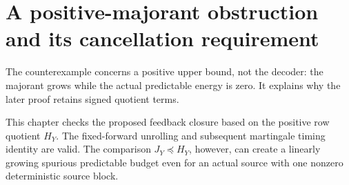 \documentclass[11pt,oneside,openany,a4paper]{book}
\numberwithin{equation}{chapter}
\theoremstyle{definition}
\theoremstyle{remark}
\newcommand{\proofstep}[1]{\par\addvspace{.45\baselineskip}\Needspace{3\baselineskip}\textbf{#1}\par\nobreak}
\newcommand{\R}{\mathbb R}\newcommand{\E}{\mathbb E}\newcommand{\Prb}{\mathbb P}\newcommand{\PP}{\mathbb P}
\newcommand{\T}{\mathsf T}\newcommand{\Id}{I}
\newcommand{\F}[1]{\left\lVert#1\right\rVert_F}
\newcommand{\N}[1]{\left\lVert#1\right\rVert}
\newcommand{\op}[1]{\left\lVert#1\right\rVert_{\rm op}}
\newcommand{\ip}[2]{\left\langle#1,#2\right\rangle_F}
\DeclareMathOperator{\tr}{tr}\DeclareMathOperator{\rank}{rank}
\DeclareMathOperator{\diag}{blockdiag}\DeclareMathOperator{\range}{range}
\DeclareMathOperator{\HSS}{HSS}\DeclareMathOperator{\dist}{dist}
\DeclareMathOperator{\Var}{Var}\DeclareMathOperator{\supp}{supp}
\newcommand{\UC}{\mathcal U}\newcommand{\VC}{\mathcal V}\newcommand{\err}{\mathcal E}
\newcommand{\Sn}[2]{\left\lVert#1\right\rVert_{S_{#2}}}
\newcommand{\Cov}{\mathsf C}\newcommand{\Loss}{\mathsf L}\newcommand{\Fil}{\mathcal F}
\DeclareMathOperator{\diver}{div}\DeclareMathOperator{\vecop}{vec}\DeclareMathOperator{\Gammafun}{Gamma}
\begin{document}
\begingroup
\let\R\relax
\newcommand{\R}{\mathbb R}
\let\E\relax
\newcommand{\E}{\mathbb E}
\let\Prb\relax
\newcommand{\Prb}{\mathbb P}
\let\T\relax
\newcommand{\T}{\mathsf T}
\let\F\relax
\newcommand{\F}[1]{\left\lVert#1\right\rVert_{F}}
\let\N\relax
\newcommand{\N}[1]{\left\lVert#1\right\rVert}
\let\ip\relax
\newcommand{\ip}[2]{\left\langle#1,#2\right\rangle_F}
\let\tr\relax
\newcommand{\tr}{\operatorname{tr}}
\let\rank\relax
\newcommand{\rank}{\operatorname{rank}}
\let\diag\relax
\newcommand{\diag}{\operatorname{blockdiag}}
\let\range\relax
\newcommand{\range}{\operatorname{range}}
\let\OPT\relax
\newcommand{\OPT}{\operatorname{OPT}}
\let\HSS\relax
\newcommand{\HSS}{\operatorname{HSS}}
\let\diver\relax
\newcommand{\diver}{\operatorname{div}}
\let\Var\relax
\newcommand{\Var}{\operatorname{Var}}
\let\UC\relax
\newcommand{\UC}{\mathcal U}
\let\VC\relax
\newcommand{\VC}{\mathcal V}
\let\err\relax
\newcommand{\err}{\mathcal E}
\let\proofstep\relax
\newcommand{\proofstep}[1]{\par\addvspace{.45\baselineskip}\Needspace{3\baselineskip}\textbf{#1}\par\nobreak}
\let\op\relax
\newcommand{\op}[1]{\left\lVert#1\right\rVert_{\mathrm{op}}}
\let\Sn\relax
\newcommand{\Sn}[2]{\left\lVert#1\right\rVert_{S_{#2}}}
\let\Cov\relax
\newcommand{\Cov}{\mathsf C}
\let\Loss\relax
\newcommand{\Loss}{\mathsf L}
\let\Fil\relax
\newcommand{\Fil}{\mathcal F}
\let\Id\relax
\newcommand{\Id}{I}
\let\supp\relax
\newcommand{\supp}{\operatorname{supp}}
\let\vecop\relax
\newcommand{\vecop}{\operatorname{vec}}
\let\Gammafun\relax
\newcommand{\Gammafun}{\operatorname{Gamma}}
\chapter{A positive-majorant obstruction and its cancellation requirement}\label{ch:rowmajorant}
\begin{scopebox}
The counterexample concerns a positive upper bound, not the decoder: the majorant grows while the actual predictable energy is zero. It explains why the later proof retains signed quotient terms.
\end{scopebox}
This chapter checks the proposed feedback closure based on the positive row quotient \(H_Y\). The fixed-forward unrolling and subsequent martingale timing identity are valid. The comparison \(J_Y\preceq H_Y\), however, can create a linearly growing spurious predictable budget even for an actual source with one nonzero deterministic source block.
\end{document}

